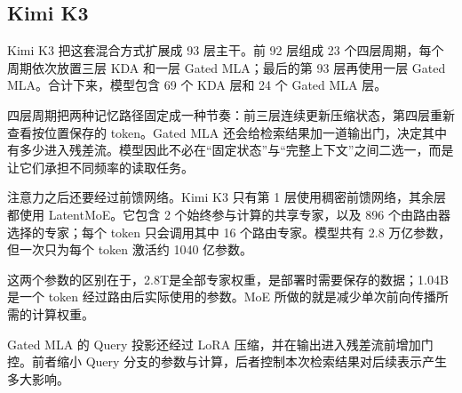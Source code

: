 \subsection{Kimi K3}

Kimi K3 把这套混合方式扩展成 93 层主干。前 92 层组成 23 个四层周期，每个周期依次放置三层 KDA 和一层 Gated MLA；最后的第 93 层再使用一层 Gated MLA。合计下来，模型包含 69 个 KDA 层和 24 个 Gated MLA 层。\cite{kimi-k3}

四层周期把两种记忆路径固定成一种节奏：前三层连续更新压缩状态，第四层重新查看按位置保存的 token。Gated MLA 还会给检索结果加一道输出门，决定其中有多少进入残差流。模型因此不必在“固定状态”与“完整上下文”之间二选一，而是让它们承担不同频率的读取任务。

注意力之后还要经过前馈网络。Kimi K3 只有第 1 层使用稠密前馈网络，其余层都使用 LatentMoE。它包含 2 个始终参与计算的共享专家，以及 896 个由路由器选择的专家；每个 token 只会调用其中 16 个路由专家。模型共有 2.8 万亿参数，但一次只为每个 token 激活约 1040 亿参数。\cite{kimi-k3}

这两个参数的区别在于，2.8T是全部专家权重，是部署时需要保存的数据；1.04B是一个 token 经过路由后实际使用的参数。MoE 所做的就是减少单次前向传播所需的计算权重。

Gated MLA 的 Query 投影还经过 LoRA 压缩，并在输出进入残差流前增加门控。前者缩小 Query 分支的参数与计算，后者控制本次检索结果对后续表示产生多大影响。

